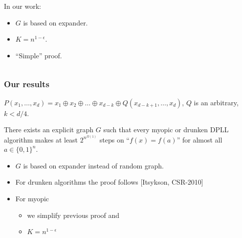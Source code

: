 \begin{frame}
\begin{itemize}
\begin{columns}
                   	\begin{column}{4cm}
                       	In our work:
	            		\pause
       		            \begin{itemize}
	   	            		\item \alert{$G$ is based on expander.}
			            	\pause
       				    	\item \alert{$K = n^{1 - \epsilon}$.}
           					\pause
			            	\item \alert{``Simple'' proof}.
			            \end{itemize}
                    \end{column}
                \end{columns}
    \end{itemize}
\end{frame}


\begin{frame}
	\frametitle{Our results}

	$P(x_1, \ldots, x_d) = x_1 \oplus x_2 \oplus \ldots \oplus
    x_{d - k} \oplus Q(x_{d - k + 1}, \ldots, x_d)$, $Q$ is an
    arbitrary, $k < d / 4$.

	\pause
	\begin{theorem}
		There exists \alert{an explicit} graph $G$ such that
		every myopic or drunken DPLL algorithm makes at least $2^{n^{\Omega(1)}}$
		steps on ``$f(x) = f(a)$'' for almost all $a \in \{0, 1\}^n$.
	\end{theorem}

    \pause
    \begin{itemize}
	    \item $G$ is based on expander instead of random graph.
    	\pause
	    \item For drunken algorithms the proof follows
    		[Itsykson, CSR-2010] 
    	\pause
	    \item For myopic 
    	\begin{itemize}
 	       \item we simplify previous proof and 
     	   \item $K = n^{1 - \epsilon}$
    	\end{itemize}
    \end{itemize}
\end{frame}

